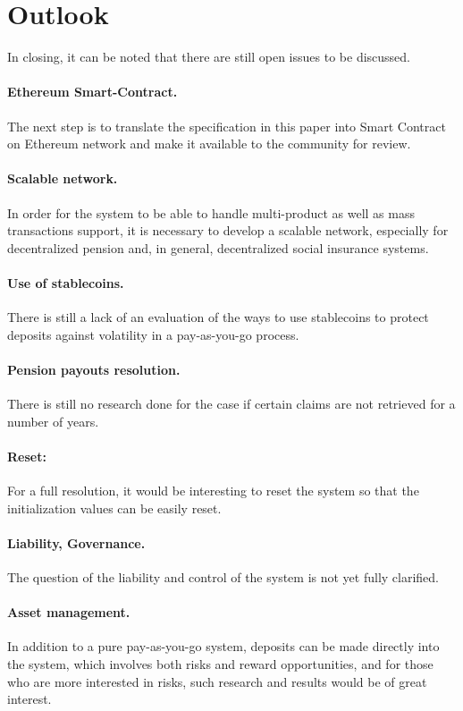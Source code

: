 \section{Outlook}


In closing, it can be noted that there are still open issues to be discussed.


\paragraph{Ethereum Smart-Contract.} The next step is to translate the specification in this paper into Smart Contract on Ethereum network and make it available to the community for review.

\paragraph{Scalable network.} In order for the system to be able to handle multi-product as well as mass transactions support, it is necessary to develop a scalable network, especially for decentralized pension and, in general, decentralized social insurance systems.

\paragraph{Use of stablecoins.} There is still a lack of an evaluation of the ways to use stablecoins  to protect deposits against volatility in a pay-as-you-go process.

\paragraph{Pension payouts resolution.} There is still no research done for the case if certain claims are not retrieved for a number of years.

\paragraph{Reset:} For a full resolution, it would be interesting to reset the system so that the initialization values can be easily reset.

\paragraph{Liability, Governance.} The question of the liability and control of the system is not yet fully clarified.

\paragraph{Asset management.} In addition to a pure pay-as-you-go system, deposits can be made directly into the system, which involves both risks and reward opportunities, and for those who are more interested in risks, such research and results would be of great interest.

